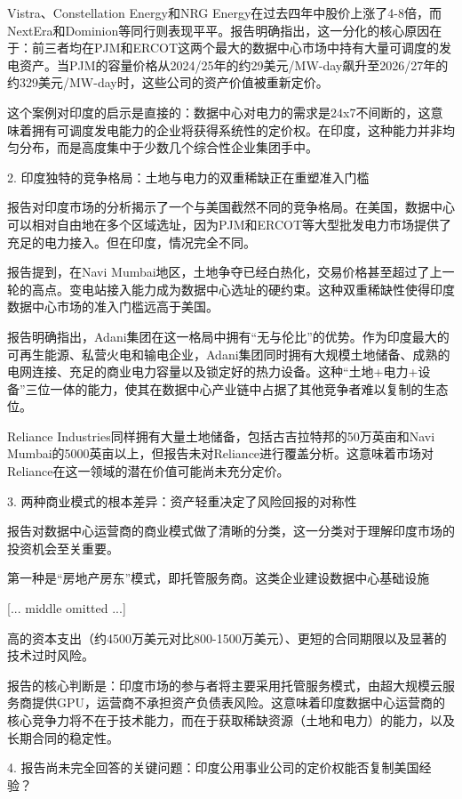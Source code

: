 \documentclass[11pt]{ctexart}
\begin{document}
Vistra、Constellation Energy和NRG Energy在过去四年中股价上涨了4-8倍，而NextEra和Dominion等同行则表现平平。报告明确指出，这一分化的核心原因在于：前三者均在PJM和ERCOT这两个最大的数据中心市场中持有大量可调度的发电资产。当PJM的容量价格从2024/25年的约29美元/MW-day飙升至2026/27年的约329美元/MW-day时，这些公司的资产价值被重新定价。

这个案例对印度的启示是直接的：数据中心对电力的需求是24x7不间断的，这意味着拥有可调度发电能力的企业将获得系统性的定价权。在印度，这种能力并非均匀分布，而是高度集中于少数几个综合性企业集团手中。

2. 印度独特的竞争格局：土地与电力的双重稀缺正在重塑准入门槛

报告对印度市场的分析揭示了一个与美国截然不同的竞争格局。在美国，数据中心可以相对自由地在多个区域选址，因为PJM和ERCOT等大型批发电力市场提供了充足的电力接入。但在印度，情况完全不同。

报告提到，在Navi Mumbai地区，土地争夺已经白热化，交易价格甚至超过了上一轮的高点。变电站接入能力成为数据中心选址的硬约束。这种双重稀缺性使得印度数据中心市场的准入门槛远高于美国。

报告明确指出，Adani集团在这一格局中拥有“无与伦比”的优势。作为印度最大的可再生能源、私营火电和输电企业，Adani集团同时拥有大规模土地储备、成熟的电网连接、充足的商业电力容量以及锁定好的热力设备。这种“土地+电力+设备”三位一体的能力，使其在数据中心产业链中占据了其他竞争者难以复制的生态位。

Reliance Industries同样拥有大量土地储备，包括古吉拉特邦的50万英亩和Navi Mumbai的5000英亩以上，但报告未对Reliance进行覆盖分析。这意味着市场对Reliance在这一领域的潜在价值可能尚未充分定价。

3. 两种商业模式的根本差异：资产轻重决定了风险回报的对称性

报告对数据中心运营商的商业模式做了清晰的分类，这一分类对于理解印度市场的投资机会至关重要。

第一种是“房地产房东”模式，即托管服务商。这类企业建设数据中心基础设施

[... middle omitted ...]

高的资本支出（约4500万美元对比800-1500万美元）、更短的合同期限以及显著的技术过时风险。

报告的核心判断是：印度市场的参与者将主要采用托管服务模式，由超大规模云服务商提供GPU，运营商不承担资产负债表风险。这意味着印度数据中心运营商的核心竞争力将不在于技术能力，而在于获取稀缺资源（土地和电力）的能力，以及长期合同的稳定性。

4. 报告尚未完全回答的关键问题：印度公用事业公司的定价权能否复制美国经验？
\end{document}
